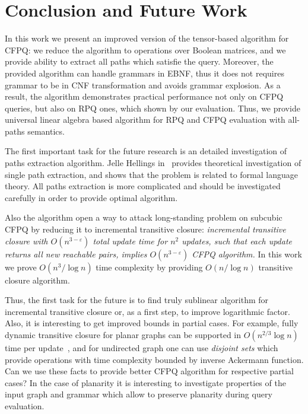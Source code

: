 \section{Conclusion and Future Work}

In this work we present an improved version of the tensor-based algorithm for CFPQ: we reduce the algorithm to operations over Boolean matrices, and we provide ability to extract all paths which satisfie the query.
Moreover, the provided algorithm can handle grammars in EBNF, thus it does not requires grammar to be in CNF transformation and avoids grammar explosion.
As a result, the algorithm demonstrates practical performance not only on CFPQ queries, but also on RPQ ones, which shown by our evaluation. 
Thus, we provide universal linear algebra based algorithm for RPQ and CFPQ evaluation with all-paths semantics.

The first important task for the future research is an detailed investigation of paths extraction algorithm.
Jelle Hellings in~\cite{!!!} provides theoretical investigation of single path extraction, and shows that the problem is related to formal language theory.
All paths extraction is more complicated and should be investigated carefully in order to provide optimal algorithm.

Also the algorithm open a way to attack long-standing problem on subcubic CFPQ by reducing it to incremental transitive closure: \textit{incremental transitive closure with $O(n^{3-\varepsilon})$ total update time for $n^2$ updates, such that each update returns all new reachable pairs, implies $O(n^{3-\varepsilon})$ CFPQ algorithm.}
In this work we prove $O(n^3/\log{n})$ time complexity by providing $O(n/\log{n})$ transitive closure algorithm.

Thus, the first task for the future is to find truly sublinear algorithm for incremental transitive closure or, as a first step, to improve logarithmic factor.
Also, it is interesting to get improved bounds in partial cases.
For example, fully dynamic transitive closure for planar graphs can be supported in $O(n^{2/3}\log{n})$ time per update~\cite{10.1007/3-540-57273-2_72}, and for undirected graph one can use \textit{disjoint sets} which provide operations with time complexity bounded by inverse Ackermann function.
Can we use these facts to provide better CFPQ algorithm for respective partial cases? 
In the case of planarity it is interesting to investigate properties of the input graph and grammar which allow to preserve planarity during query evaluation.

